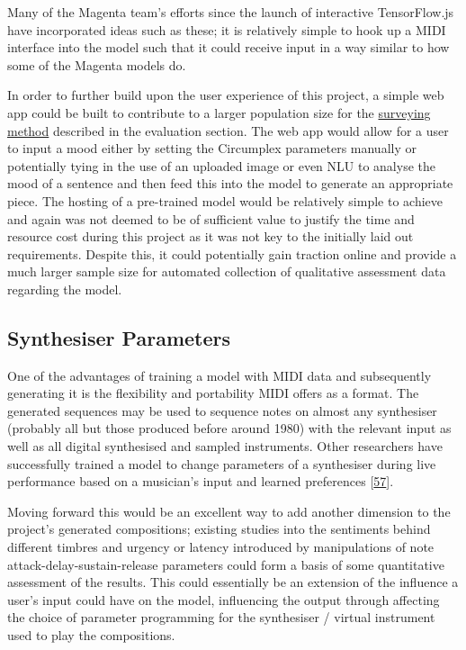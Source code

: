 \documentclass[12pt,]{article}
\begin{document}
Many of the Magenta team's efforts since the launch of interactive
TensorFlow.js have incorporated ideas such as these; it is relatively
simple to hook up a MIDI interface into the model such that it could
receive input in a way similar to how some of the Magenta models do.

In order to further build upon the user experience of this project, a
simple web app could be built to contribute to a larger population size
for the \protect\hyperlink{qualitativesurveryingmethod}{surveying
method} described in the evaluation section. The web app would allow for
a user to input a mood either by setting the Circumplex parameters
manually or potentially tying in the use of an uploaded image or even
NLU to analyse the mood of a sentence and then feed this into the model
to generate an appropriate piece. The hosting of a pre-trained model
would be relatively simple to achieve and again was not deemed to be of
sufficient value to justify the time and resource cost during this
project as it was not key to the initially laid out requirements.
Despite this, it could potentially gain traction online and provide a
much larger sample size for automated collection of qualitative
assessment data regarding the model.

\hypertarget{synthesiser-parameters}{%
\subsection{Synthesiser Parameters}\label{synthesiser-parameters}}

One of the advantages of training a model with MIDI data and
subsequently generating it is the flexibility and portability MIDI
offers as a format. The generated sequences may be used to sequence
notes on almost any synthesiser (probably all but those produced before
around 1980) with the relevant input as well as all digital synthesised
and sampled instruments. Other researchers have successfully trained a
model to change parameters of a synthesiser during live performance
based on a musician's input and learned preferences
{[}\protect\hyperlink{ref-sommer2014towards}{57}{]}.

Moving forward this would be an excellent way to add another dimension
to the project's generated compositions; existing studies into the
sentiments behind different timbres and urgency or latency introduced by
manipulations of note attack-delay-sustain-release parameters could form
a basis of some quantitative assessment of the results. This could
essentially be an extension of the influence a user's input could have
on the model, influencing the output through affecting the choice of
parameter programming for the synthesiser / virtual instrument used to
play the compositions.
\end{document}
